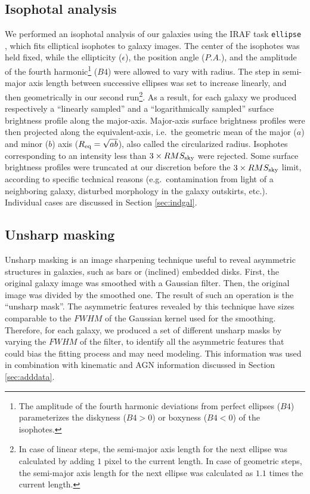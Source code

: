 \documentclass[preprint2]{emulateapj}
\begin{document}
\subsection{Isophotal analysis}
We performed an isophotal analysis of our galaxies using the IRAF task {\tt ellipse} \citep{taskellipse}, 
which fits elliptical isophotes to galaxy images.
The center of the isophotes was held fixed, while the ellipticity ($\epsilon$), the position angle ($P.A.$),  
and the amplitude of the fourth harmonic\footnote{The amplitude of the fourth harmonic deviations from perfect ellipses 
($B4$) parameterizes the diskyness ($B4>0$) or boxyness ($B4<0$) of the isophotes.} ($B4$) were allowed to vary with radius.
The step in semi-major axis length between successive ellipses was set to increase linearly, 
and then geometrically in our second run\footnote{In case of linear steps, 
the semi-major axis length for the next ellipse was calculated by adding $1$ pixel to the current length.
In case of geometric steps, the semi-major axis length for the next ellipse 
was calculated as $1.1$ times the current length.}.
As a result, for each galaxy we produced respectively a ``linearly sampled'' and a ``logarithmically sampled'' 
surface brightness profile along the major-axis. 
Major-axis surface brightness profiles were then projected along the equivalent-axis,
i.e.~the geometric mean of the major ($a$) and minor ($b$) axis ($R_{\rm eq} = \sqrt{ab}$), 
also called the circularized radius.
Isophotes corresponding to an intensity less than $3 \times RMS_{\rm sky}$ were rejected.
Some surface brightness profiles were truncated at our discretion before the $3 \times RMS_{\rm sky}$ limit, 
according to specific technical reasons (e.g.~contamination from light of a neighboring galaxy, 
disturbed morphology in the galaxy outskirts, etc.).
Individual cases are discussed in Section \ref{sec:indgal}.

\subsection{Unsharp masking}
Unsharp masking is an image sharpening technique useful to reveal asymmetric structures in galaxies, 
such as bars or (inclined) embedded disks. 
First, the original galaxy image was smoothed with a Gaussian filter.
Then, the original image was divided by the smoothed one. 
The result of such an operation is the ``unsharp mask''. 
The asymmetric features revealed by this technique have sizes 
comparable to the $FWHM$ of the Gaussian kernel used for the smoothing.
Therefore, for each galaxy, we produced a set of different unsharp masks by varying the $FWHM$ of the filter,
to identify all the asymmetric features that could bias the fitting process and may need modeling.
This information was used in combination with kinematic and AGN information discussed in Section \ref{sec:adddata}.
\end{document}
